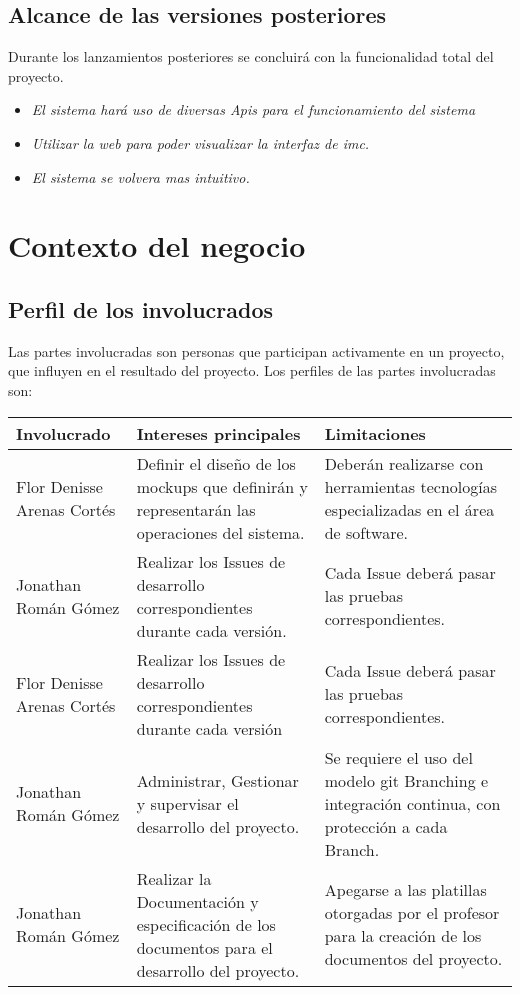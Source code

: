 \documentclass[12pt,a4paper]{book}
\begin{document}
\section{Alcance de las versiones posteriores}
\vspace{0.5 cm}
Durante los lanzamientos posteriores se concluirá con la funcionalidad total del proyecto.\\
\begin{itemize}
\item \textit{El sistema hará uso de diversas Apis para el funcionamiento del sistema}
\item \textit{Utilizar la web para poder visualizar la interfaz de imc.}
\item \textit{El sistema se volvera mas intuitivo.}
\end{itemize} 
\newpage
\chapter{Contexto del negocio}
\section{Perfil de los involucrados}
Las partes involucradas son personas que participan activamente en un proyecto, que influyen en el resultado del proyecto. Los perfiles de las partes involucradas son:
\begin{table}[h!]
\begin{tabular}{|p{5 cm}|p{5 cm}|p{5 cm}|}
\hline
\textbf{Involucrado}&\textbf{Intereses principales}&\textbf{Limitaciones}
\\\hline

Flor Denisse Arenas Cortés&Definir el diseño de los mockups que definirán y representarán las operaciones del sistema. & Deberán realizarse con herramientas tecnologías especializadas en el área de software.\\\hline

Jonathan Román Gómez&Realizar los Issues de desarrollo correspondientes durante cada versión. &Cada Issue deberá pasar las pruebas correspondientes.\\\hline

Flor Denisse Arenas Cortés&Realizar los Issues de desarrollo correspondientes durante cada versión &Cada Issue deberá pasar las pruebas correspondientes.\\\hline

Jonathan Román Gómez & Administrar, Gestionar y supervisar el desarrollo del proyecto.&Se requiere el uso del modelo git Branching e integración continua, con protección a cada Branch.\\\hline

Jonathan Román Gómez &Realizar la Documentación y especificación de los documentos para el desarrollo del proyecto.&Apegarse a las platillas otorgadas por el profesor para la creación de los documentos del proyecto.\\\hline

\end{tabular}
\end{table}
\newpage
\end{document}
